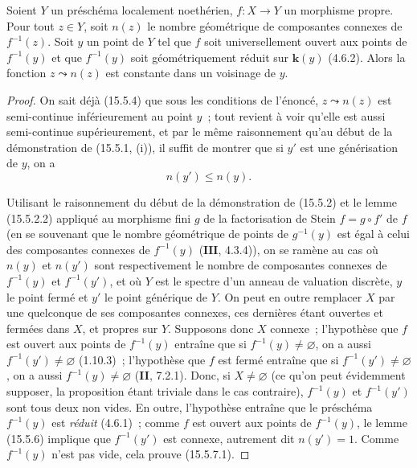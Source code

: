\begin{proposition}[15.5.7]
\label{IV.15.5.7-fr}
Soient $Y$ un préschéma localement noethérien, $f:X\to Y$ un morphisme propre. Pour tout $z\in Y$, soit $n(z)$ le nombre géométrique de composantes connexes de $f^{-1}(z)$. Soit $y$ un point de $Y$ tel que $f$ soit universellement ouvert aux points de $f^{-1}(y)$ et que $f^{-1}(y)$ soit géométriquement réduit sur $\boldsymbol{k}(y)$ \textup{(4.6.2)}. Alors la fonction $z\leadsto n(z)$ est constante dans un voisinage de $y$.
\end{proposition}

\begin{proof}
On sait déjà (15.5.4) que sous les conditions de l'énoncé, $z\leadsto n(z)$ est semi-continue inférieurement au point $y$~; tout revient à voir qu'elle est aussi semi-continue supérieurement, et par le même raisonnement qu'au début de la démonstration de (15.5.1, (i)), il suffit de montrer que si $y'$ est une générisation de $y$, on a
\begin{equation}
\tag{15.5.7.1}
\label{IV.15.5.7.1-fr}
  n(y')\leqslant n(y).
\end{equation}

Utilisant le raisonnement du début de la démonstration de (15.5.2) et le lemme (15.5.2.2) appliqué au morphisme fini $g$ de la factorisation de Stein $f=g\circ f'$ de $f$ (en se souvenant que le nombre géométrique de points de $g^{-1}(y)$ est égal à celui des composantes connexes de $f^{-1}(y)$ ($\mathbf{III}$, 4.3.4)), on se ramène au cas où $n(y)$ et $n(y')$ sont respectivement le nombre de composantes connexes de $f^{-1}(y)$ et $f^{-1}(y')$, et où $Y$ est le spectre d'un anneau de valuation discrète, $y$ le point fermé et $y'$ le point générique de $Y$. On peut en outre remplacer $X$ par une quelconque de ses composantes connexes, ces dernières étant ouvertes et fermées dans $X$, et propres sur $Y$. Supposons donc $X$ connexe~; l'hypothèse que $f$ est ouvert aux points de $f^{-1}(y)$ entraîne que si $f^{-1}(y)\ne\varnothing$, on a aussi $f^{-1}(y')\ne\varnothing$ (1.10.3)~; l'hypothèse que $f$ est fermé entraîne que si $f^{-1}(y')\ne\varnothing$, on a aussi $f^{-1}(y)\ne\varnothing$ (\textbf{II}, 7.2.1). Donc, si $X\ne\varnothing$ (ce qu'on peut évidemment supposer, la proposition étant triviale dans le cas contraire), $f^{-1}(y)$ et $f^{-1}(y')$ sont tous deux non vides. En outre, l'hypothèse entraîne que le préschéma $f^{-1}(y)$ est \emph{réduit} (4.6.1)~; comme $f$ est ouvert aux points de $f^{-1}(y)$, le lemme (15.5.6) implique que $f^{-1}(y')$ est connexe, autrement dit $n(y')=1$. Comme $f^{-1}(y)$ n'est pas vide, cela prouve (15.5.7.1).
\end{proof}

